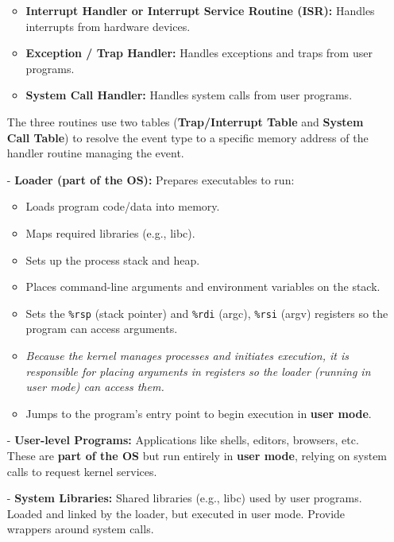 \documentclass[8pt]{extarticle}
\begin{document}
\begin{minipage}[htp]{0.5\textwidth}
\begin{minipage}[htp]{1\textwidth}
\begin{itemize}[noitemsep,nolistsep,topsep=-10px,partopsep=0pt,parsep=0pt]
        \begin{itemize}[noitemsep,nolistsep,topsep=-10px,partopsep=0pt,parsep=0pt]  
            \item \textbf{Interrupt Handler or Interrupt Service Routine (ISR):} Handles interrupts from hardware devices.
            \item \textbf{Exception / Trap Handler:} Handles exceptions and traps from user programs.
            \item \textbf{System Call Handler:} Handles system calls from user programs.
        \end{itemize}
        \vspace{10px}
        The three routines use two tables (\textbf{Trap/Interrupt Table} and \textbf{System Call Table}) to resolve the event type to a specific memory address of the handler routine managing the event.
        \item[-] \textbf{Loader (part of the OS):} Prepares executables to run:
        \begin{itemize}[noitemsep,nolistsep,topsep=-10px,partopsep=0pt,parsep=0pt]  
            \item Loads program code/data into memory.
            \item Maps required libraries (e.g., libc).
            \item Sets up the process stack and heap.
            \item Places command-line arguments and environment variables on the stack.
            \item Sets the \texttt{\%rsp} (stack pointer) and \texttt{\%rdi} (argc), \texttt{\%rsi} (argv) registers so the program can access arguments.
            \item \textit{Because the kernel manages processes and initiates execution, it is responsible for placing arguments in registers so the loader (running in user mode) can access them.}
            \item Jumps to the program's entry point to begin execution in \textbf{user mode}.
        \end{itemize}
        \item[-] \textbf{User-level Programs:} Applications like shells, editors, browsers, etc. These are \textbf{part of the OS} but run entirely in \textbf{user mode}, relying on system calls to request kernel services.
        \item[-] \textbf{System Libraries:} Shared libraries (e.g., libc) used by user programs. Loaded and linked by the loader, but executed in user mode. Provide wrappers around system calls.
    \end{itemize}
    \end{minipage}
\end{minipage}\\[5px]
\end{document}
